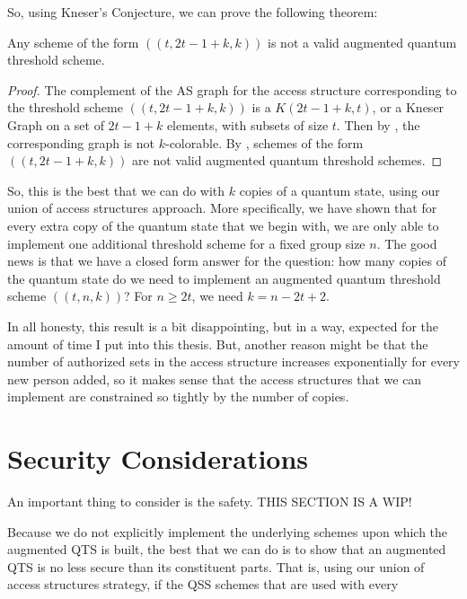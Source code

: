So, using Kneser's Conjecture, we can prove the following theorem:

\begin{theorem}
    \label{thm:no-more} 
    Any scheme of the form $((t,2t-1+k,k))$ is not a valid augmented quantum threshold scheme.
\end{theorem}

\begin{proof}
    The complement of the AS graph for the access structure corresponding to the threshold scheme $((t,2t-1+k,k))$ is a $K(2t-1+k,t)$, or a Kneser Graph on a set of $2t-1+k$ elements, with subsets of size $t$. Then by \label{cor:no}, the corresponding graph is not $k$-colorable. By , schemes of the form $((t,2t-1+k,k))$ are not valid augmented quantum threshold schemes.
\end{proof}

So, this is the best that we can do with $k$ copies of a quantum state, using our union of access structures approach. More specifically, we have shown that for every extra copy of the quantum state that we begin with, we are only able to implement one additional threshold scheme for a fixed group size $n$. The good news is that we have a closed form answer for the question: how many copies of the quantum state do we need to implement an augmented quantum threshold scheme $((t,n,k))$? For $n \geq 2t$, we need $k = n - 2t + 2$.

In all honesty, this result is a bit disappointing, but in a way, expected for the amount of time I put into this thesis. But, another reason might be that the number of authorized sets in the access structure increases exponentially for every new person added, so it makes sense that the access structures that we can implement are constrained so tightly by the number of copies.

\section{Security Considerations}

An important thing to consider is the safety. THIS SECTION IS A WIP!

Because we do not explicitly implement the underlying schemes upon which the augmented QTS is built, the best that we can do is to show that an augmented QTS is no less secure than its constituent parts. That is, using our union of access structures strategy, if the QSS schemes that are used with every 

